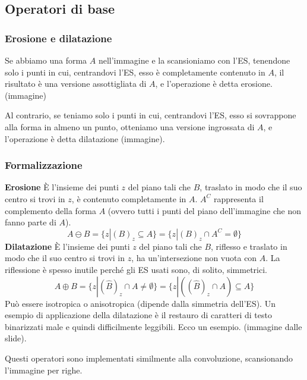 \documentclass[a4paper,11pt]{article}
\begin{document}
\subsection{Operatori di base}
\subsubsection{Erosione e dilatazione}
Se abbiamo una forma $A$ nell'immagine e la scansioniamo con l'ES, tenendone solo i punti in cui, centrandovi l'ES, esso è completamente contenuto in
$A$, il risultato è una versione assottigliata di $A$, e l'operazione è detta erosione. (immagine)
\par
Al contrario, se teniamo solo i punti in cui, centrandovi l'ES, esso si sovrappone alla forma in almeno un punto, otteniamo una versione
ingrossata di $A$, e l'operazione è detta dilatazione (immagine).

\subsubsection{Formalizzazione}
\textbf{Erosione}\newline
È l'insieme dei punti $z$ del piano tali che $B$, traslato in modo che il suo centro si trovi in $z$, è
contenuto completamente in $A$. $A^C$ rappresenta il complemento della forma $A$ (ovvero tutti i punti del piano dell'immagine che non fanno parte di $A$).
\[
A \ominus B = \{ z | (B)_z \subseteq A \} = \{ z | (B)_z \cap A^C = \emptyset \}
\]
\newline
\textbf{Dilatazione}\newline
È l'insieme dei punti $z$ del piano tali che $B$, riflesso e traslato in modo che il suo centro si trovi in $z$, ha un'intersezione non vuota con $A$.
La riflessione è spesso inutile perché gli ES usati sono, di solito, simmetrici.
\[
A \oplus B = \{ z | (\hat{B})_z \cap A \neq \emptyset \} = \{ z | ((\hat{B})_z \cap A) \subseteq A \}
\]
Può essere isotropica o anisotropica (dipende dalla simmetria dell'ES). Un esempio di applicazione della dilatazione è il restauro
di caratteri di testo binarizzati male e quindi difficilmente leggibili. Ecco un esempio. (immagine dalle slide).
\par
Questi operatori sono implementati similmente alla convoluzione, scansionando l'immagine per righe.
\end{document}
